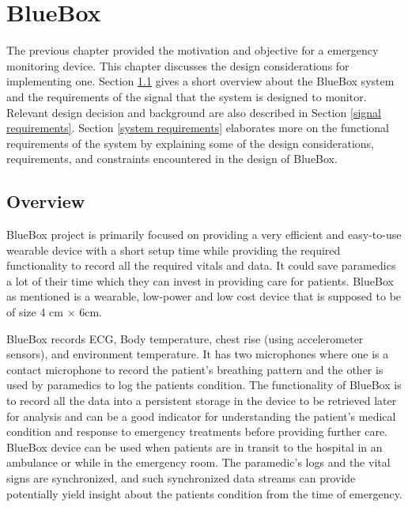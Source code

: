 \chapter{BlueBox }

The previous chapter provided the motivation and objective for a
emergency monitoring device. This chapter discusses the design
considerations for implementing one.  Section \ref{overview} gives a
short overview about the BlueBox system and the requirements of the
signal that the system is designed to monitor. Relevant design
decision and background are also described in Section \ref{signal
requirements}.  Section \ref{system requirements} elaborates more on
the functional requirements of the system by explaining some of the
design considerations, requirements, and constraints encountered in
the design of BlueBox.

\section{Overview}\label{overview}

BlueBox project is primarily focused on providing a very efficient
and easy-to-use wearable device with a short setup time while
providing the required functionality to record all the required
vitals and data. It could save paramedics a lot of their time which
they can invest in providing care for patients. BlueBox as mentioned
is a wearable, low-power and low cost device that is supposed to be
of size 4 cm $\times$ 6cm.

BlueBox records ECG, Body temperature, chest rise (using
accelerometer sensors), and environment temperature. It has two
microphones where one is a contact microphone to record the patient's
breathing pattern and the other is used by paramedics to log the
patients condition. The functionality of BlueBox is to record all the
data into a persistent storage in the device to be retrieved later
for analysis and can be a good indicator for understanding the
patient's medical condition and response to emergency treatments
before providing further care.  BlueBox device can be used when
patients are in transit to the hospital in an ambulance or while in
the emergency room. The paramedic's logs and the vital signs are
synchronized, and such synchronized data streams can provide
potentially yield insight about the patients condition from the time
of emergency. 


